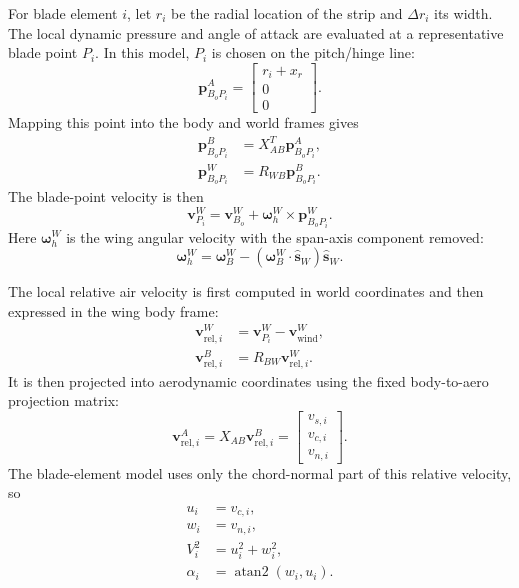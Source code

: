 \documentclass{article}
\begin{document}
For blade element \(i\), let \(r_i\) be the radial location of the strip and
\(\Delta r_i\) its width. The local dynamic pressure and angle of attack are
evaluated at a representative blade point \(P_i\). In this model, \(P_i\) is chosen
on the pitch/hinge line:
\begin{equation}
    \mathbf{p}_{B_oP_i}^{A}
    =
    \begin{bmatrix}
        r_i+x_r \\
        0 \\
        0
    \end{bmatrix}.
\end{equation}
Mapping this point into the body and world frames gives
\begin{align}
    \mathbf{p}_{B_oP_i}^{B}
        &=
        X_{AB}^{T}\mathbf{p}_{B_oP_i}^{A}, \\
    \mathbf{p}_{B_oP_i}^{W}
        &=
        R_{WB}\mathbf{p}_{B_oP_i}^{B}.
\end{align}
The blade-point velocity is then
\begin{equation}
    \mathbf{v}_{P_i}^{W}
        =
        \mathbf{v}_{B_o}^{W}
        +
        \boldsymbol{\omega}_{h}^{W}
        \times
        \mathbf{p}_{B_oP_i}^{W}.
\end{equation}
Here \(\boldsymbol{\omega}_{h}^{W}\) is the wing angular velocity with the span-axis
component removed:
\begin{equation}
    \boldsymbol{\omega}_{h}^{W}
    =
    \boldsymbol{\omega}_{B}^{W}
    -
    \left(
        \boldsymbol{\omega}_{B}^{W}
        \cdot
        \hat{\mathbf{s}}_W
    \right)
    \hat{\mathbf{s}}_W.
\end{equation}

The local relative air velocity is first computed in world coordinates and then
expressed in the wing body frame:
\begin{align}
    \mathbf{v}_{\mathrm{rel},i}^{W}
        &=
        \mathbf{v}_{P_i}^{W}
        -
        \mathbf{v}_{\mathrm{wind}}^{W}, \\
    \mathbf{v}_{\mathrm{rel},i}^{B}
        &=
        R_{BW}\mathbf{v}_{\mathrm{rel},i}^{W}.
\end{align}
It is then projected into aerodynamic coordinates using the fixed body-to-aero
projection matrix:
\begin{equation}
    \mathbf{v}_{\mathrm{rel},i}^{A}
    =
    X_{AB}\mathbf{v}_{\mathrm{rel},i}^{B}
    =
    \begin{bmatrix}
        v_{s,i}\\
        v_{c,i}\\
        v_{n,i}
    \end{bmatrix}.
\end{equation}
The blade-element model uses only the chord-normal part of this relative velocity,
so
\begin{align}
    u_i &= v_{c,i}, \\
    w_i &= v_{n,i}, \\
    V_i^2 &= u_i^2+w_i^2, \\
    \alpha_i &= \operatorname{atan2}(w_i,u_i).
\end{align}
\end{document}

